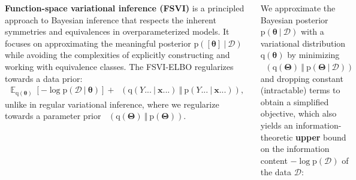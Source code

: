 \documentclass[25pt,a0paper,landscape]{tikzposter}
\DeclareMathOperator{\opExpectation}{\mathbb{E}}
\newcommand{\E}[2]{\opExpectation_{#1} \left [ #2 \right ]}
\newcommand{\MidSymbol}[1][]{\:#1\:}
\newcommand{\given}{\MidSymbol[\vert]}
\DeclareMathOperator{\opEntropy}{H}
\newcommand{\xHof}[1]{\opEntropy(#1)}
\DeclareMathOperator{\opKale}{D_\mathrm{KL}}
\newcommand{\Kale}[2]{\opKale(#1 \MidSymbol[\Vert] #2)}
\newcommand{\opp}{\mathrm{p}}
\newcommand{\pof}[1]{\opp(#1)}
\newcommand{\opq}{\mathrm{q}}
\newcommand{\qof}[1]{\opq(#1)}
\newcommand{\w}{\boldsymbol{\theta}}
\newcommand{\W}{\boldsymbol{\Theta}}
\newcommand{\Dany}{\mathcal{D}}
\newcommand{\Y}{Y}
\newcommand{\x}{\boldsymbol{x}}
\begin{document}
\begin{columns}
\begin{subcolumns}
\end{subcolumns}
{
  \begin{tldrbox}
    \textbf{Function-space variational inference (FSVI)} is a principled approach to Bayesian inference that respects the inherent symmetries and equivalences in overparameterized models. It focuses on approximating the meaningful posterior $\pof{[\w] \given \Dany}$ while avoiding the complexities of explicitly constructing and working with equivalence classes.
    The FSVI-ELBO regularizes towards a data prior:
    \begin{align*}
    \E{\qof{\w}}{-\log \pof{\Dany \given \w}} + \Kale{\qof{\Y... \given \x...}}{\pof{\Y... \given \x...}},
    \end{align*}
    unlike in regular variational inference, where we regularize towards a parameter prior $\Kale{\qof{\W}}{\pof{\W}}$.
  \end{tldrbox}
  \begin{multicols}{2}
    \begin{backgroundbox}[title=(Regular) Variational Inference \& ELBO]
      We approximate the Bayesian posterior $\pof{\w \given \Dany}$ with a variational distribution $\qof{\w}$ by minimizing $\Kale{\qof{\W}}{\pof{\W \given \Dany}}$ and dropping constant (intractable) terms to obtain a simplified objective, which also yields an information-theoretic \textbf{upper} bound on the information content $-\log \pof{\Dany}$ of the data $\Dany$:

\end{backgroundbox}
\end{multicols}}
\end{columns}
\end{document}
